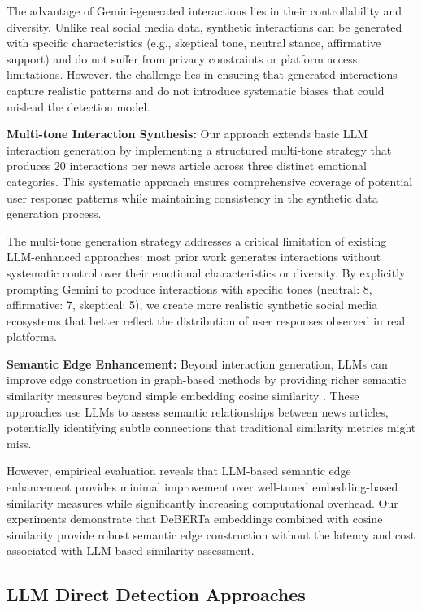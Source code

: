 The advantage of Gemini-generated interactions lies in their controllability and diversity. Unlike real social media data, synthetic interactions can be generated with specific characteristics (e.g., skeptical tone, neutral stance, affirmative support) and do not suffer from privacy constraints or platform access limitations. However, the challenge lies in ensuring that generated interactions capture realistic patterns and do not introduce systematic biases that could mislead the detection model.

\textbf{Multi-tone Interaction Synthesis:} Our approach extends basic LLM interaction generation by implementing a structured multi-tone strategy that produces 20 interactions per news article across three distinct emotional categories. This systematic approach ensures comprehensive coverage of potential user response patterns while maintaining consistency in the synthetic data generation process.

The multi-tone generation strategy addresses a critical limitation of existing LLM-enhanced approaches: most prior work generates interactions without systematic control over their emotional characteristics or diversity. By explicitly prompting Gemini to produce interactions with specific tones (neutral: 8, affirmative: 7, skeptical: 5), we create more realistic synthetic social media ecosystems that better reflect the distribution of user responses observed in real platforms.

\textbf{Semantic Edge Enhancement:} Beyond interaction generation, LLMs can improve edge construction in graph-based methods by providing richer semantic similarity measures beyond simple embedding cosine similarity \cite{liu2023large, chen2023llm}. These approaches use LLMs to assess semantic relationships between news articles, potentially identifying subtle connections that traditional similarity metrics might miss.

However, empirical evaluation reveals that LLM-based semantic edge enhancement provides minimal improvement over well-tuned embedding-based similarity measures while significantly increasing computational overhead. Our experiments demonstrate that DeBERTa embeddings combined with cosine similarity provide robust semantic edge construction without the latency and cost associated with LLM-based similarity assessment.

\subsection{LLM Direct Detection Approaches}

